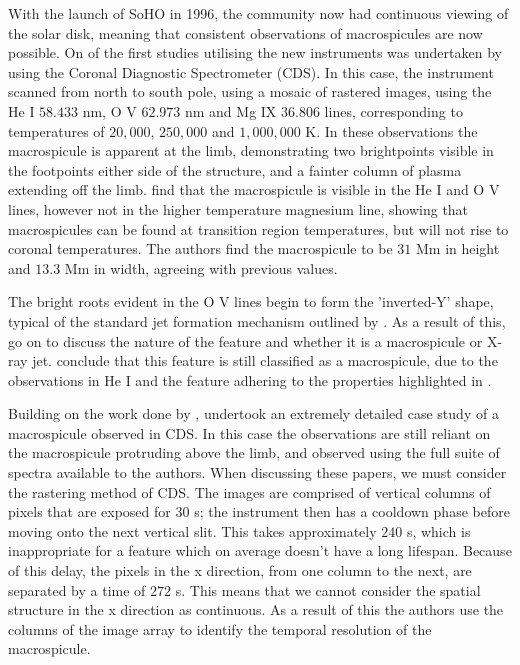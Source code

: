With the launch of SoHO in 1996, the community now had continuous viewing of the solar disk, meaning that consistent observations of macrospicules are now possible.
On of the first studies utilising the new instruments was undertaken by \cite{Pike1997} using the Coronal Diagnostic Spectrometer (CDS).
In this case, the instrument scanned from north to south pole, using a mosaic of rastered images, using the He I $58.433$ nm, O V $62.973$ nm and Mg IX $36.806$ lines, corresponding to temperatures of $20,000$, $250,000$ and $1,000,000$ K.
In these observations the macrospicule is apparent at the limb, demonstrating two brightpoints visible in the footpoints either side of the structure, and a fainter column of plasma extending off the limb.
\cite{Pike1997} find that the macrospicule is visible in the He I and O V lines, however not in the higher temperature magnesium line, showing that macrospicules can be found at transition region temperatures, but will not rise to coronal temperatures.
The authors find the macrospicule to be $31$ Mm in height and $13.3$ Mm in width, agreeing with previous values.

The bright roots evident in the O V lines begin to form the 'inverted-Y' shape, typical of the standard jet formation mechanism outlined by \cite{Shibata1992}.
As a result of this, \cite{Pike1997} go on to discuss the nature of the feature and whether it is a macrospicule or X-ray jet.
\cite{Pike1997} conclude that this feature is still classified as a macrospicule, due to the observations in He I and the feature adhering to the properties highlighted in \cite{Bohlin1975}.

Building on the work done by \cite{Pike1997}, \cite{Parenti2002} undertook an extremely detailed case study of a macrospicule observed in CDS.
In this case the observations are still reliant on the macrospicule protruding above the limb, and observed using the full suite of spectra available to the authors.
When discussing these papers, we must consider the rastering method of CDS.
The images are comprised of vertical columns of pixels that are exposed for $30 $ s; the instrument then has a cooldown phase before moving onto the next vertical slit.
This takes approximately $240$ s, which is inappropriate for a feature which on average doesn't have a long lifespan.
Because of this delay, the pixels in the x direction, from one column to the next, are separated by a time of $272$ s.
This means that we cannot consider the spatial structure in the x direction as continuous.
As a result of this the authors use the columns of the image array to identify the temporal resolution of the macrospicule. 

